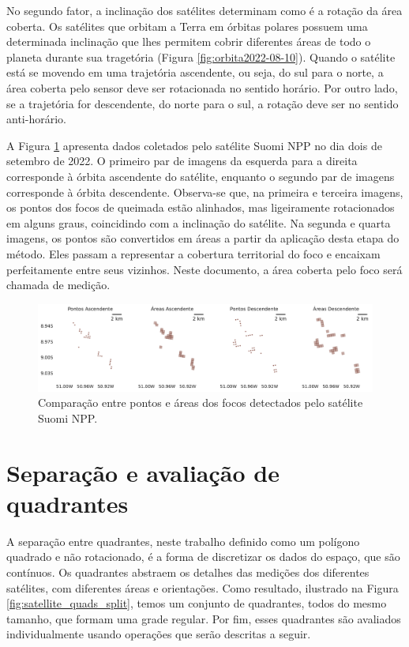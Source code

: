 \documentclass[cic,tc]{iiufrgs}
\begin{document}
No segundo fator, a inclinação dos satélites determinam como é a rotação da área coberta. Os satélites que orbitam a Terra em órbitas polares possuem uma determinada inclinação que lhes permitem cobrir diferentes áreas de todo o planeta durante sua tragetória (Figura \ref{fig:orbita2022-08-10}). Quando o satélite está se movendo em uma trajetória ascendente, ou seja, do sul para o norte, a área coberta pelo sensor deve ser rotacionada no sentido horário. Por outro lado, se a trajetória for descendente, do norte para o sul, a rotação deve ser no sentido anti-horário.

A Figura \ref{fig:comparacao_pontos_e_areas} apresenta dados coletados pelo satélite Suomi NPP no dia dois de setembro de 2022. O primeiro par de imagens da esquerda para a direita corresponde à órbita ascendente do satélite, enquanto o segundo par de imagens corresponde à órbita descendente. Observa-se que, na primeira e terceira imagens, os pontos dos focos de queimada estão alinhados, mas ligeiramente rotacionados em alguns graus, coincidindo com a inclinação do satélite. Na segunda e quarta imagens, os pontos são convertidos em áreas a partir da aplicação desta etapa do método. Eles passam a representar a cobertura territorial do foco e encaixam perfeitamente entre seus vizinhos. Neste documento, a área coberta pelo foco será chamada de medição.

\begin{figure}[!htb]
    \caption{Comparação entre pontos e áreas dos focos detectados pelo satélite Suomi NPP.}
    \begin{center}
        \includegraphics[width=35em]{comparacao_pontos_e_areas}
    \end{center}
    \label{fig:comparacao_pontos_e_areas}
\end{figure}

\section{Separação e avaliação de quadrantes}
\label{sec:separacao_e_avaliacao}

A separação entre quadrantes, neste trabalho definido como um polígono quadrado e não rotacionado, é a forma de discretizar os dados do espaço, que são contínuos. Os quadrantes abstraem os detalhes das medições dos diferentes satélites, com diferentes áreas e orientações. Como resultado, ilustrado na Figura \ref{fig:satellite_quads_split}, temos um conjunto de quadrantes, todos do mesmo tamanho, que formam uma grade regular. Por fim, esses quadrantes são avaliados individualmente usando operações que serão descritas a seguir. 
\end{document}
